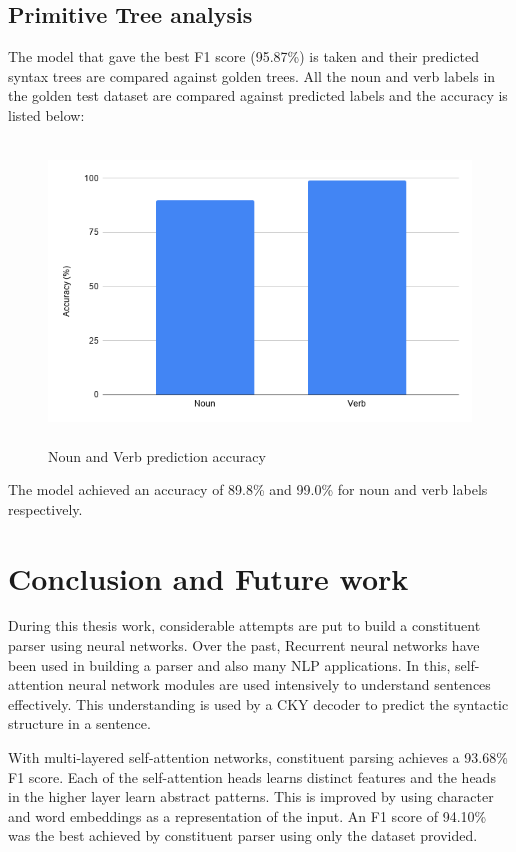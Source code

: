 \documentclass[a4paper, 11pt]{article}
\begin{document}
\subsection{Primitive Tree analysis}

The model that gave the best F1 score (95.87\%) is taken and their predicted syntax trees are compared against golden trees. All the noun and verb labels in the golden test dataset are compared against predicted labels and the accuracy is listed below:

\begin{figure}[H]
    \centering
    \includegraphics[width=\textwidth,height=8cm,keepaspectratio=true]
    {noun-verb-accuracy.png}
    \caption{
        Noun and Verb prediction accuracy 
    }
    \label{fig:noun-verb-accuracy}
\end{figure}

The model achieved an accuracy of 89.8\% and 99.0\% for noun and verb labels respectively. 

\pagebreak
\section{Conclusion and Future work}
During this thesis work, considerable attempts are put to build a constituent parser using neural networks. Over the past, Recurrent neural networks have been used in building a parser and also many NLP applications. In this, self-attention neural network modules are used intensively to understand sentences effectively. This understanding is used by a CKY decoder to predict the syntactic structure in a sentence. 

With multi-layered self-attention networks, constituent parsing achieves a 93.68\% F1 score. Each of the self-attention heads learns distinct features and the heads in the higher layer learn abstract patterns. This is improved by using character and word embeddings as a representation of the input. An F1 score of 94.10\% was the best achieved by constituent parser using only the dataset provided. 
\end{document}
